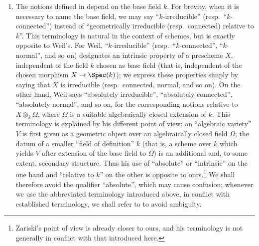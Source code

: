 \begin{remarks}[4.5.12]
\label{IV.4.5.12}
\begin{enumerate}
\item[\rm(i)]
\label{IV.4.5.12.i}
The notions defined in  depend on the base field $k$.
For brevity, when it is necessary to name the base field, we may say
``$k$-irreducible'' (resp.\ ``$k$-connected'') instead of
``geometrically irreducible (resp.\ connected) relative to $k$''.
This terminology is natural in the context of schemes, but is exactly
opposite to Weil's.
For Weil, ``$k$-irreducible'' (resp.\ ``$k$-connected'',
``$k$-normal'', and so on) designates an intrinsic property of a
prescheme $X$, independent of the field $k$ chosen as base field
(that is, independent of the chosen morphism
$X\to\Spec(k)$); we express these properties simply by saying that
$X$ is irreducible (resp.\ connected, normal, and so on).
On the other hand, Weil says ``absolutely irreducible'',
``absolutely connected'', ``absolutely normal'', and so on, for the
corresponding notions relative to $X\otimes_k\Omega$, where $\Omega$
is a suitable algebraically closed extension of $k$.
This terminology is explained by his different point of view:
an ``algebraic variety'' $V$ is first given as a geometric object over
an algebraically closed field $\Omega$; the datum of a smaller
``field of definition'' $k$ (that is, a scheme over $k$ which yields
$V$ after extension of the base field to $\Omega$) is an additional
and, to some extent, secondary structure.
Thus his use of ``absolute'' or ``intrinsic'' on the one hand and
``relative to $k$'' on the other is opposite to ours.\footnote{Zariski's
point of view is already closer to ours, and his terminology is not
generally in conflict with that introduced here.}
We shall therefore avoid the qualifier ``absolute'', which may cause
confusion; whenever we use the abbreviated terminology introduced
above, in conflict with established terminology, we shall refer to
 to avoid ambiguity.


\end{enumerate}
\end{remarks}
